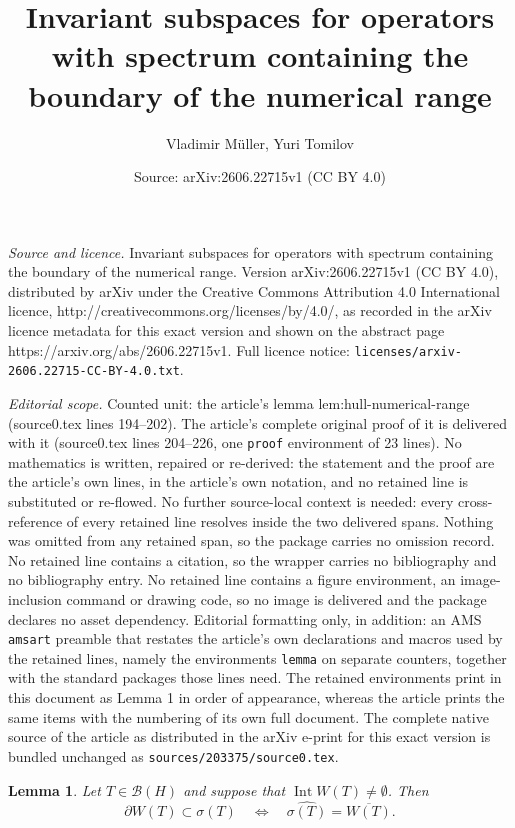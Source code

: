 \documentclass[10pt,a4paper]{amsart}
\title{Invariant subspaces for operators with spectrum containing the boundary of the numerical range}
\author{Vladimir M\"uller, Yuri Tomilov}
\date{Source: arXiv:2606.22715v1 (CC BY 4.0)}
\newtheorem{lemma}{Lemma}
\newcommand{\BH}{\mathcal B(H)}
\begin{document}
\maketitle

\noindent\emph{Source and licence.} Invariant subspaces for operators with spectrum containing the boundary of the numerical range. Version arXiv:2606.22715v1 (CC BY 4.0), distributed by arXiv under the Creative Commons Attribution 4.0 International licence, http://creativecommons.org/licenses/by/4.0/, as recorded in the arXiv licence metadata for this exact version and shown on the abstract page https://arxiv.org/abs/2606.22715v1. Full licence notice: \texttt{licenses/arxiv-2606.22715-CC-BY-4.0.txt}.\par\smallskip

\noindent\textit{Editorial scope.} Counted unit: the article's lemma lem:hull-numerical-range (source0.tex lines 194--202). The article's complete original proof of it is delivered with it (source0.tex lines 204--226, one \texttt{proof} environment of 23 lines). No mathematics is written, repaired or re-derived: the statement and the proof are the article's own lines, in the article's own notation, and no retained line is substituted or re-flowed.  No further source-local context is needed: every cross-reference of every retained line resolves inside the two delivered spans.  Nothing was omitted from any retained span, so the package carries no omission record.  No retained line contains a citation, so the wrapper carries no bibliography and no bibliography entry.  No retained line contains a figure environment, an image-inclusion command or drawing code, so no image is delivered and the package declares no asset dependency.  Editorial formatting only, in addition: an AMS \texttt{amsart} preamble that restates the article's own declarations and macros used by the retained lines, namely the environments \texttt{lemma} on separate counters, together with the standard packages those lines need.  The retained environments print in this document as Lemma 1 in order of appearance, whereas the article prints the same items with the numbering of its own full document.  The complete native source of the article as distributed in the arXiv e-print for this exact version is bundled unchanged as \texttt{sources/203375/source0.tex}.
\begin{lemma}\label{lem:hull-numerical-range}
Let $T\in\BH$ and suppose that $\operatorname{Int} W(T)\ne\emptyset$.
Then
\[
        \partial W(T)\subset\sigma(T)
        \quad\Longleftrightarrow\quad
        \widehat{\sigma(T)}=\overline{W(T)}.
\]
\end{lemma}
\end{document}

